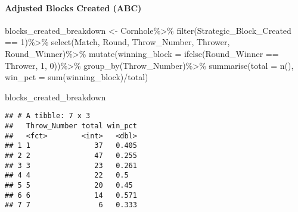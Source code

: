 \documentclass[
]{article}
\newenvironment{Shaded}{\begin{snugshade}}{\end{snugshade}}
\newcommand{\AttributeTok}[1]{\textcolor[rgb]{0.77,0.63,0.00}{#1}}
\newcommand{\DecValTok}[1]{\textcolor[rgb]{0.00,0.00,0.81}{#1}}
\newcommand{\FunctionTok}[1]{\textcolor[rgb]{0.00,0.00,0.00}{#1}}
\newcommand{\NormalTok}[1]{#1}
\newcommand{\OtherTok}[1]{\textcolor[rgb]{0.56,0.35,0.01}{#1}}
\newcommand{\SpecialCharTok}[1]{\textcolor[rgb]{0.00,0.00,0.00}{#1}}
\begin{document}
\hypertarget{adjusted-blocks-created-abc}{%
\paragraph{Adjusted Blocks Created
(ABC)}\label{adjusted-blocks-created-abc}}

\begin{Shaded}
\begin{Highlighting}[]
\NormalTok{blocks\_created\_breakdown }\OtherTok{\textless{}{-}}\NormalTok{ Cornhole}\SpecialCharTok{\%\textgreater{}\%}
  \FunctionTok{filter}\NormalTok{(Strategic\_Block\_Created }\SpecialCharTok{==} \DecValTok{1}\NormalTok{)}\SpecialCharTok{\%\textgreater{}\%}
  \FunctionTok{select}\NormalTok{(Match, Round, Throw\_Number, Thrower, Round\_Winner)}\SpecialCharTok{\%\textgreater{}\%}
  \FunctionTok{mutate}\NormalTok{(}\AttributeTok{winning\_block =} \FunctionTok{ifelse}\NormalTok{(Round\_Winner }\SpecialCharTok{==}\NormalTok{ Thrower, }\DecValTok{1}\NormalTok{, }\DecValTok{0}\NormalTok{))}\SpecialCharTok{\%\textgreater{}\%}
  \FunctionTok{group\_by}\NormalTok{(Throw\_Number)}\SpecialCharTok{\%\textgreater{}\%}
  \FunctionTok{summarise}\NormalTok{(}\AttributeTok{total =} \FunctionTok{n}\NormalTok{(),}
            \AttributeTok{win\_pct =} \FunctionTok{sum}\NormalTok{(winning\_block)}\SpecialCharTok{/}\NormalTok{total)}

\NormalTok{blocks\_created\_breakdown}
\end{Highlighting}
\end{Shaded}

\begin{verbatim}
## # A tibble: 7 x 3
##   Throw_Number total win_pct
##   <fct>        <int>   <dbl>
## 1 1               37   0.405
## 2 2               47   0.255
## 3 3               23   0.261
## 4 4               22   0.5  
## 5 5               20   0.45 
## 6 6               14   0.571
## 7 7                6   0.333
\end{verbatim}

\begin{Shaded}
\end{Shaded}
\end{document}
